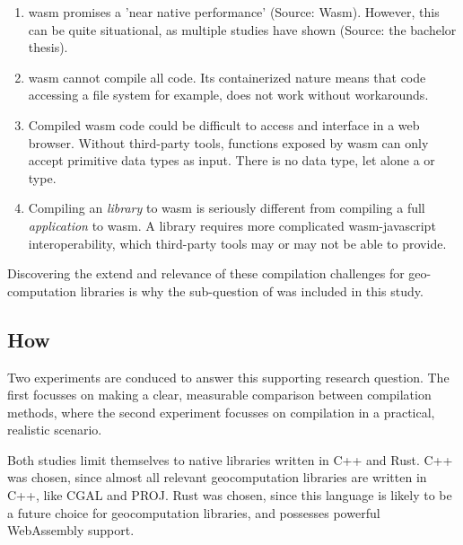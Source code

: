 
\begin{enumerate}[-]
  \item \ac{wasm} promises a 'near native performance' (Source: Wasm). However, this can be quite situational, as multiple studies have shown \cite{jangda_not_2019} (Source: the bachelor thesis). 
  \item \ac{wasm} cannot compile all code. Its containerized nature means that code accessing a file system for example, does not work without workarounds. 
  \item Compiled \ac{wasm} code could be difficult to access and interface in a web browser. Without third-party tools, functions exposed by \ac{wasm} can only accept primitive data types as input. There is no  data type, let alone a  or  type. 
  \item Compiling an \emph{library} to \ac{wasm} is seriously different from compiling a full \emph{application} to wasm. A library requires more complicated wasm-javascript interoperability, which third-party tools may or may not be able to provide.
\end{enumerate}
Discovering the extend and relevance of these compilation challenges for geo-computation libraries is why the sub-question of \mySubRQTwoTitle \space was included in this study. 

\subsection*{How}

Two experiments are conduced to answer this supporting research question. 
The first focusses on making a clear, measurable comparison between compilation methods, where the second experiment focusses on compilation in a practical, realistic scenario. 

Both studies limit themselves to native libraries written in C++ and Rust. 
C++ was chosen, since almost all relevant geocomputation libraries are written in C++, like CGAL and PROJ. 
Rust was chosen, since this language is likely to be a future choice for geocomputation libraries, and possesses powerful WebAssembly support. 

